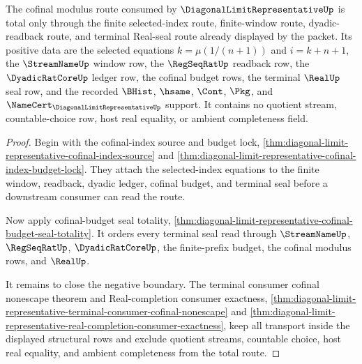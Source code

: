 \begin{theorem}
\label{thm:diagonal-limit-representative-cofinal-modulus-route-totality}
The cofinal modulus route consumed by $\DiagonalLimitRepresentativeUp$ is total only through the finite selected-index route, finite-window route, dyadic-readback route, and terminal Real-seal route already displayed by the packet. Its positive data are the selected equations $k=\mu(1/(n+1))$ and $i=k+n+1$, the $\StreamNameUp$ window row, the $\RegSeqRatUp$ readback row, the $\DyadicRatCoreUp$ ledger row, the cofinal budget rows, the terminal $\RealUp$ seal row, and the recorded $\BHist$, $\hsame$, $\Cont$, $\Pkg$, and $\NameCert_{\DiagonalLimitRepresentativeUp}$ support. It contains no quotient stream, countable-choice row, host real equality, or ambient completeness field.
\end{theorem}
\begin{proof}
Begin with the cofinal-index source and budget lock, \autoref{thm:diagonal-limit-representative-cofinal-index-source} and \autoref{thm:diagonal-limit-representative-cofinal-index-budget-lock}. They attach the selected-index equations to the finite window, readback, dyadic ledger, cofinal budget, and terminal seal before a downstream consumer can read the route.

Now apply cofinal-budget seal totality, \autoref{thm:diagonal-limit-representative-cofinal-budget-seal-totality}. It orders every terminal seal read through $\StreamNameUp$, $\RegSeqRatUp$, $\DyadicRatCoreUp$, the finite-prefix budget, the cofinal modulus rows, and $\RealUp$.

It remains to close the negative boundary. The terminal consumer cofinal nonescape theorem and Real-completion consumer exactness, \autoref{thm:diagonal-limit-representative-terminal-consumer-cofinal-nonescape} and \autoref{thm:diagonal-limit-representative-real-completion-consumer-exactness}, keep all transport inside the displayed structural rows and exclude quotient streams, countable choice, host real equality, and ambient completeness from the total route.
\end{proof}

